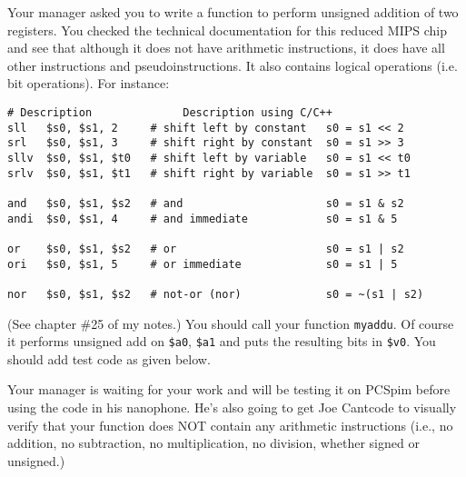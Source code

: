 Your manager asked you to write a function to perform unsigned addition of two
registers.
You checked the technical documentation for this reduced MIPS chip and see that
although it does not have arithmetic instructions, it does have all other
instructions and pseudoinstructions.
It also contains logical operations (i.e. bit operations). For instance:
\begin{Verbatim}[frame=single,fontsize=\small]
                      # Description              Description using C/C++
sll   $s0, $s1, 2     # shift left by constant   s0 = s1 << 2	
srl   $s0, $s1, 3     # shift right by constant  s0 = s1 >> 3
sllv  $s0, $s1, $t0   # shift left by variable   s0 = s1 << t0
srlv  $s0, $s1, $t1   # shift right by variable  s0 = s1 >> t1
                                                 
and   $s0, $s1, $s2   # and                      s0 = s1 & s2
andi  $s0, $s1, 4     # and immediate            s0 = s1 & 5
                                                 
or    $s0, $s1, $s2   # or                       s0 = s1 | s2
ori   $s0, $s1, 5     # or immediate             s0 = s1 | 5
                                                 
nor   $s0, $s1, $s2   # not-or (nor)             s0 = ~(s1 | s2)
\end{Verbatim}
(See chapter \#25 of my notes.)
You should call your function \verb!myaddu!.
Of course it performs unsigned add on \verb!$a0!, \verb!$a1! and puts the
resulting bits in \verb!$v0!.
You should add test code as given below.

Your manager is waiting for your work and will be testing it on PCSpim before
using the code in his nanophone.
He's also going to get Joe Cantcode to visually verify that your function does
NOT contain any arithmetic instructions (i.e., no addition, no subtraction,
no multiplication, no division, whether signed or unsigned.)

